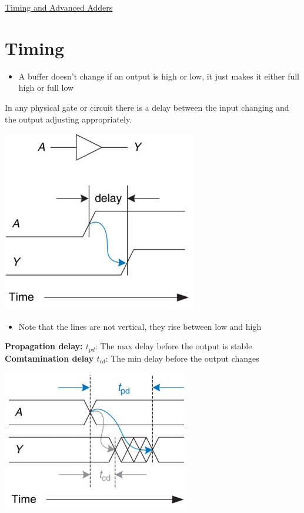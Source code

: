 \documentclass{article}[18pt]
\begin{document}
\begin{center}
\underline{\huge Timing and Advanced Adders}
\end{center}
\section{Timing}
\begin{itemize}
	\item A buffer doesn't change if an output is high or low, it just makes it either full high or full low
\end{itemize}
In any physical gate or circuit there is a delay between the input changing and the output adjusting appropriately.
\begin{center}
	\includegraphics[scale=0.7]{timing}
\end{center}
\begin{itemize}
	\item Note that the lines are not vertical, they rise between low and high
\end{itemize}
\textbf{Propagation delay: $t_{pd}$}: The max delay before the output is stable\\
\textbf{Comtamination delay $t_{cd}$}: The min delay before the output changes
\begin{center}
	\includegraphics[scale=0.7]{delay}
\end{center}
\end{document}

